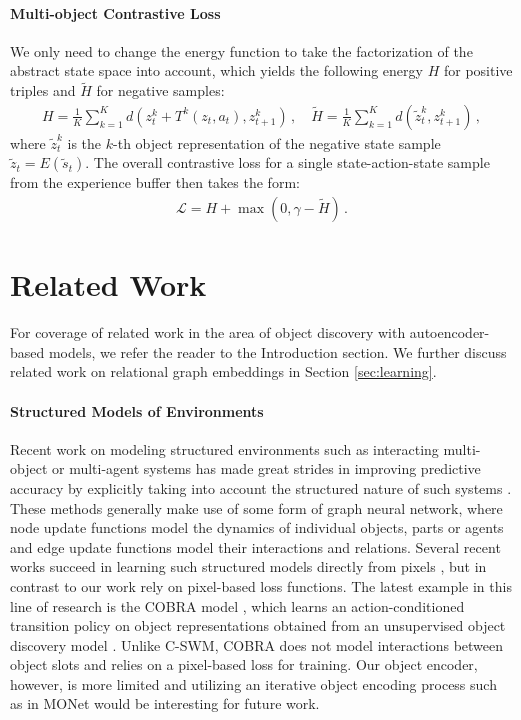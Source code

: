\documentclass{article} %
\begin{document}
\paragraph{Multi-object Contrastive Loss}
We only need to change the energy function to take the factorization of the abstract state space into account, which yields the following energy $H$ for positive triples and $\tilde{H}$ for negative samples:
\begin{align}
H = \frac{1}{K}\sum_{k=1}^K d(z_t^k + T^k(z_t, a_t), z_{t+1}^k)\, , \quad
\tilde{H} = \frac{1}{K}\sum_{k=1}^K d(\tilde{z}_{t}^k, z_{t+1}^k)\, ,
\end{align}
where $\tilde{z}_{t}^k$ is the $k$-th object representation of the negative state sample $\tilde{z}_{t} = E(\tilde{s}_{t})$. The overall contrastive loss for a single state-action-state sample from the experience buffer then takes the form:
\begin{align}
\label{eq:multi-obj-loss}
\mathcal{L} = H + \max(0, \gamma - \tilde{H})\, .
\end{align}


\section{Related Work}
For coverage of related work in the area of object discovery with autoencoder-based models, we refer the reader to the Introduction section. We further discuss related work on relational graph embeddings in Section \ref{sec:learning}.

\paragraph{Structured Models of Environments}
Recent work on modeling structured environments such as interacting multi-object or multi-agent systems has made great strides in improving predictive accuracy by explicitly taking into account the structured nature of such systems \citep{sukhbaatar2016learning,chang2016compositional,battaglia2016interaction,watters2017visual,hoshen2017vain,wang2018nervenet,van2018relational,kipf2018neural,sanchez2018graph,xu2019unsupervised}. These methods generally make use of some form of graph neural network, where node update functions model the dynamics of individual objects, parts or agents and edge update functions model their interactions and relations. Several recent works succeed in learning such structured models directly from pixels \citep{watters2017visual,van2018relational,xu2019unsupervised,watters2019cobra}, but in contrast to our work rely on pixel-based loss functions. The latest example in this line of research is the COBRA model \citep{watters2019cobra}, which learns an action-conditioned transition policy on object representations obtained from an unsupervised object discovery model \citep{burgess2019monet}. Unlike C-SWM, COBRA does not model interactions between object slots and relies on a pixel-based loss for training. Our object encoder, however, is more limited and utilizing an iterative object encoding process such as in MONet \citep{burgess2019monet} would be interesting for future work.
\end{document}
